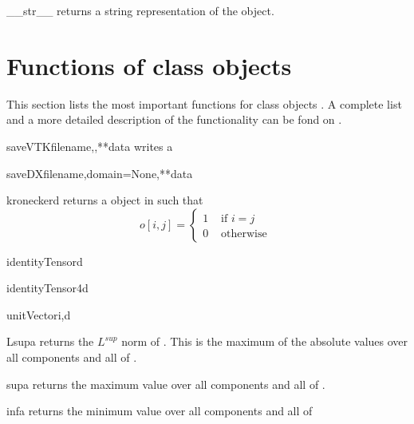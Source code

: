 \begin{methoddesc}[Data]{__str__}{}
returns a string representation of the object.
\end{methoddesc}

\section{Functions of \Data class objects}
This section lists the most important functions for \Data class objects .
A complete list and a more detailed description of the functionality can be fond on \ReferenceGuide.
\begin{funcdesc}{saveVTK}{filename,,**data}
writes a 
\end{funcdesc}
\begin{funcdesc}{saveDX}{filename,domain=None,**data}
\end{funcdesc}
\begin{funcdesc}{kronecker}{d}
returns a \RankTwo \Data object  in \FunctionSpace {} such that
\begin{equation}
o\left[ i,j\right] = \left\{ 
\begin{array}{cc}
1 & \mbox{ if } i=j \\
0 & \mbox{ otherwise }
\end{array}
\right.
\end{equation}
\end{funcdesc}

\begin{funcdesc}{identityTensor}{d}
\end{funcdesc}
\begin{funcdesc}{identityTensor4}{d}
\end{funcdesc}
\begin{funcdesc}{unitVector}{i,d}
\end{funcdesc}

\begin{funcdesc}{Lsup}{a}
returns the $L^{sup}$ norm of . This is the maximum of the absolute values
 over all components and all \DataSamplePoints of . 
\end{funcdesc}

\begin{funcdesc}{sup}{a}
returns the maximum value over all components and all \DataSamplePoints of .
\end{funcdesc}

\begin{funcdesc}{inf}{a}
returns the minimum value over all components and all \DataSamplePoints of 
\end{funcdesc}

